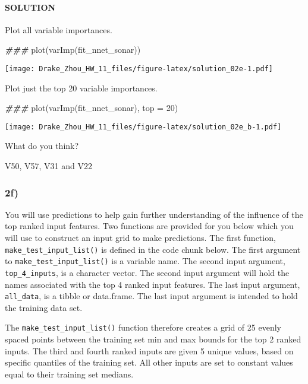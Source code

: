 \documentclass[
]{article}
\newenvironment{Shaded}{\begin{snugshade}}{\end{snugshade}}
\newcommand{\AttributeTok}[1]{\textcolor[rgb]{0.77,0.63,0.00}{#1}}
\newcommand{\DecValTok}[1]{\textcolor[rgb]{0.00,0.00,0.81}{#1}}
\newcommand{\DocumentationTok}[1]{\textcolor[rgb]{0.56,0.35,0.01}{\textbf{\textit{#1}}}}
\newcommand{\FunctionTok}[1]{\textcolor[rgb]{0.00,0.00,0.00}{#1}}
\newcommand{\NormalTok}[1]{#1}
\begin{document}
\hypertarget{solution-9}{%
\paragraph{SOLUTION}\label{solution-9}}

Plot all variable importances.

\begin{Shaded}
\begin{Highlighting}[]
\DocumentationTok{\#\#\#}
\FunctionTok{plot}\NormalTok{(}\FunctionTok{varImp}\NormalTok{(fit\_nnet\_sonar))}
\end{Highlighting}
\end{Shaded}

\texttt{[image: Drake\_Zhou\_HW\_11\_files/figure-latex/solution\_02e-1.pdf]}

Plot just the top 20 variable importances.

\begin{Shaded}
\begin{Highlighting}[]
\DocumentationTok{\#\#\#}
\FunctionTok{plot}\NormalTok{(}\FunctionTok{varImp}\NormalTok{(fit\_nnet\_sonar), }\AttributeTok{top =} \DecValTok{20}\NormalTok{)}
\end{Highlighting}
\end{Shaded}

\texttt{[image: Drake\_Zhou\_HW\_11\_files/figure-latex/solution\_02e\_b-1.pdf]}

What do you think?

V50, V57, V31 and V22

\hypertarget{f}{%
\subsubsection{2f)}\label{f}}

You will use predictions to help gain further understanding of the
influence of the top ranked input features. Two functions are provided
for you below which you will use to construct an input grid to make
predictions. The first function, \texttt{make\_test\_input\_list()} is
defined in the code chunk below. The first argument to
\texttt{make\_test\_input\_list()} is a variable name. The second input
argument, \texttt{top\_4\_inputs}, is a character vector. The second
input argument will hold the names associated with the top 4 ranked
input features. The last input argument, \texttt{all\_data}, is a tibble
or data.frame. The last input argument is intended to hold the training
data set.

The \texttt{make\_test\_input\_list()} function therefore creates a grid
of 25 evenly spaced points between the training set min and max bounds
for the top 2 ranked inputs. The third and fourth ranked inputs are
given 5 unique values, based on specific quantiles of the training set.
All other inputs are set to constant values equal to their training set
medians.
\end{document}
